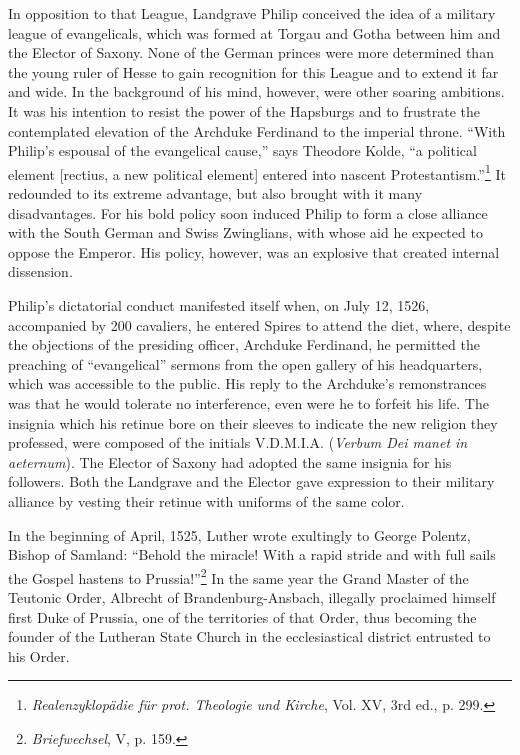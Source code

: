 In opposition to that League, Landgrave Philip conceived the idea
of a military league of evangelicals, which was formed at Torgau and
Gotha between him and the Elector of Saxony. None of the German
princes were more determined than the young ruler of Hesse to gain
recognition for this League and to extend it far and wide. In the
background of his mind, however, were other soaring ambitions. It
was his intention to resist the power of the Hapsburgs and to frustrate
the contemplated elevation of the Archduke Ferdinand to the imperial throne.
“With Philip’s espousal of the evangelical cause,” says
Theodore Kolde, “a political element [rectius, a new political element]
entered into nascent Protestantism.”\footnote
{\textit{Realenzyklopädie für prot. Theologie und Kirche}, Vol. XV, 3rd ed., p. 299.}
It redounded to its extreme
advantage, but also brought with it many disadvantages. For his bold
policy soon induced Philip to form a close alliance with the South
German and Swiss Zwinglians, with whose aid he expected to oppose
the Emperor. His policy, however, was an explosive that created internal
dissension.

Philip’s dictatorial conduct manifested itself when, on July 12,
1526, accompanied by 200 cavaliers, he entered Spires to attend
the diet, where, despite the objections of the presiding officer, Archduke
Ferdinand, he permitted the preaching of “evangelical” sermons
from the open gallery of his headquarters, which was accessible to
the public. His reply to the Archduke’s remonstrances was that
he would tolerate no interference, even were he to forfeit his life.
The insignia which his retinue bore on their sleeves to indicate the
new religion they professed, were composed of the initials V.D.M.I.A.
(\textit{Verbum Dei manet in aeternum}). The Elector of Saxony had
adopted the same insignia for his followers. Both the Landgrave and
the Elector gave expression to their military alliance by vesting their
retinue with uniforms of the same color.

In the beginning of April, 1525, Luther wrote exultingly to
George Polentz, Bishop of Samland: “Behold the miracle! With a
rapid stride and with full sails the Gospel hastens to Prussia!”\footnote
{\textit{Briefwechsel}, V, p. 159.}
In the same year the Grand Master of the Teutonic Order, Albrecht of
Brandenburg-Ansbach, illegally proclaimed himself first Duke of
Prussia, one of the territories of that Order, thus becoming the founder
of the Lutheran State Church in the ecclesiastical district entrusted to
his Order.


